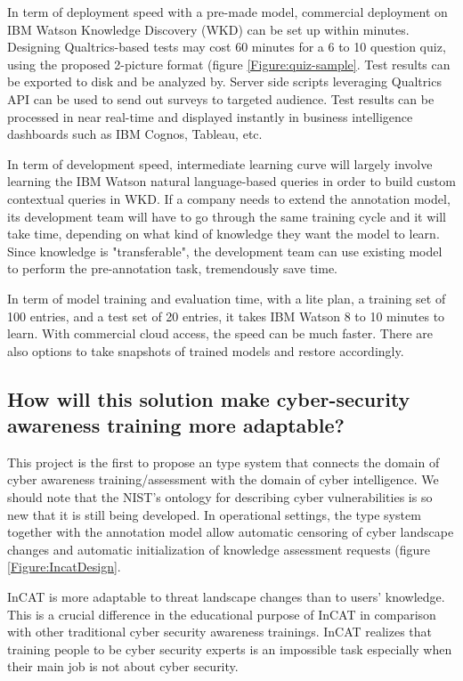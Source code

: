 \documentclass[conference]{IEEEtran}
\begin{document}
In term of deployment speed with a pre-made model, commercial deployment on IBM Watson Knowledge Discovery (WKD) can be set up within minutes. Designing Qualtrics-based tests may cost 60 minutes for a 6 to 10 question quiz, using the proposed 2-picture format (figure \ref{Figure:quiz-sample}. Test results can be exported to disk and be analyzed by. Server side scripts leveraging Qualtrics API can be used to send out surveys to targeted audience. Test results can be processed in near real-time and displayed instantly in business intelligence dashboards such as IBM Cognos, Tableau, etc.

In term of development speed, intermediate learning curve will largely involve learning the IBM Watson natural language-based queries in order to build custom contextual queries in WKD. If a company needs to extend the annotation model, its development team will have to go through the same training cycle and it will take time, depending on what kind of knowledge they want the model to learn. Since knowledge is "transferable", the development team can use existing model to perform the pre-annotation task, tremendously save time.

In term of model training and evaluation time, with a lite plan, a training set of 100 entries, and a test set of 20 entries, it takes IBM Watson 8 to 10 minutes to learn. With commercial cloud access, the speed can be much faster. There are also options to take snapshots of trained models and restore accordingly.

\subsection{How will this solution make cyber-security awareness training more adaptable?}
This project is the first to propose an type system that connects the domain of cyber awareness training/assessment with the domain of cyber intelligence. We should note that the NIST's ontology for describing cyber vulnerabilities is so new that it is still being developed. In operational settings, the type system together with the annotation model allow automatic censoring of cyber landscape changes and automatic initialization of knowledge assessment requests (figure \ref{Figure:IncatDesign}.

InCAT is more adaptable to threat landscape changes than to users' knowledge. This is a crucial difference in the educational purpose of InCAT in comparison with other traditional cyber security awareness trainings. InCAT realizes that training people to be cyber security experts is an impossible task especially when their main job is not about cyber security.
\end{document}
